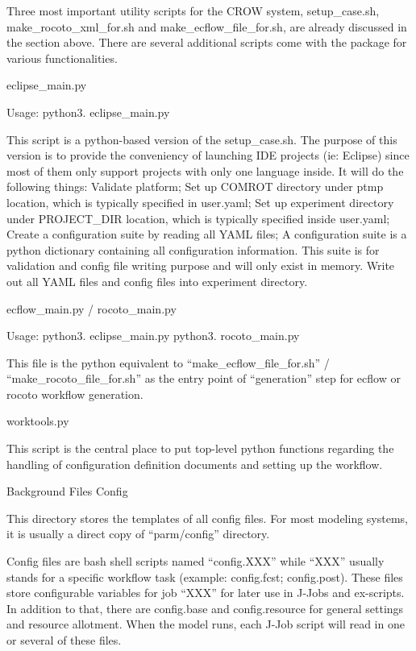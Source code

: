 Three most important utility scripts for the C\-R\-O\-W system, setup\-\_\-case.\-sh, make\-\_\-rocoto\-\_\-xml\-\_\-for.\-sh and make\-\_\-ecflow\-\_\-file\-\_\-for.\-sh, are already discussed in the section above. There are several additional scripts come with the package for various functionalities.

eclipse\-\_\-main.\-py

Usage\-: python3. eclipse\-\_\-main.\-py

This script is a python-\/based version of the setup\-\_\-case.\-sh. The purpose of this version is to provide the conveniency of launching I\-D\-E projects (ie\-: Eclipse) since most of them only support projects with only one language inside. It will do the following things\-: Validate platform; Set up C\-O\-M\-R\-O\-T directory under ptmp location, which is typically specified in user.\-yaml; Set up experiment directory under P\-R\-O\-J\-E\-C\-T\-\_\-\-D\-I\-R location, which is typically specified inside user.\-yaml; Create a configuration suite by reading all Y\-A\-M\-L files; A configuration suite is a python dictionary containing all configuration information. This suite is for validation and config file writing purpose and will only exist in memory. Write out all Y\-A\-M\-L files and config files into experiment directory.

ecflow\-\_\-main.\-py / rocoto\-\_\-main.\-py

Usage\-: python3. eclipse\-\_\-main.\-py python3. rocoto\-\_\-main.\-py

This file is the python equivalent to “make\-\_\-ecflow\-\_\-file\-\_\-for.\-sh” / “make\-\_\-rocoto\-\_\-file\-\_\-for.\-sh” as the entry point of “generation” step for ecflow or rocoto workflow generation.

worktools.\-py

This script is the central place to put top-\/level python functions regarding the handling of configuration definition documents and setting up the workflow.

Background Files Config

This directory stores the templates of all config files. For most modeling systems, it is usually a direct copy of “parm/config” directory.

Config files are bash shell scripts named “config.\-X\-X\-X” while “\-X\-X\-X” usually stands for a specific workflow task (example\-: config.\-fcst; config.\-post). These files store configurable variables for job “\-X\-X\-X” for later use in J-\/\-Jobs and ex-\/scripts. In addition to that, there are config.\-base and config.\-resource for general settings and resource allotment. When the model runs, each J-\/\-Job script will read in one or several of these files.

